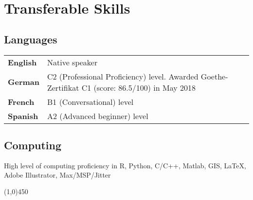 \section*{Transferable Skills}

\subsection*{Languages}

\begin{center}
\begin{tabular}{ l l }
\textbf{English}  & Native speaker\\ 
\textbf{German} & C2 (Professional Proficiency) level. Awarded Goethe-Zertifikat C1 (score: 86.5/100) in May 2018\\ 
\textbf{French}  & B1 (Conversational) level\\ 
\textbf{Spanish}  & A2 (Advanced beginner) level\\ 
\end{tabular}
\end{center}

\subsection*{Computing}

\noindent High level of computing proficiency in R, Python, C/C++, Matlab, GIS, \LaTeX, Adobe Illustrator, Max/MSP/Jitter



\begin{center} \line(1,0){450} \end{center}